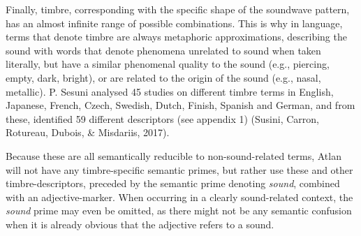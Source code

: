 Finally, timbre, corresponding with the specific shape of the soundwave pattern, has an almost infinite range of possible combinations. This is why in language, terms that denote timbre are always metaphoric approximations, describing the sound with words that denote phenomena unrelated to sound when taken literally, but have a similar phenomenal quality to the sound (e.g., piercing, empty, dark, bright), or are related to the origin of the sound (e.g., nasal, metallic). P. Sesuni analysed 45 studies on different timbre terms in English, Japanese, French, Czech, Swedish, Dutch, Finish, Spanish and German, and from these, identified 59 different descriptors (see appendix 1) (Susini, Carron, Rotureau, Dubois, \& Misdariis, 2017). 

Because these are all semantically reducible to non-sound-related terms, Atlan will not have any timbre-specific semantic primes, but rather use these and other timbre-descriptors, preceded by the semantic prime denoting \textit{sound}, combined with an adjective-marker. When occurring in a clearly sound-related context, the \textit{sound} prime may even be omitted, as there might not be any semantic confusion when it is already obvious that the adjective refers to a sound. 





